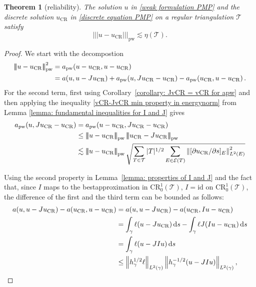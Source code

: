 \documentclass[11pt,a4paper]{article}
\newcommand{\uCR}{u_{\mathrm{CR}}}
\newcommand{\ds}{\,\mathrm{d}s}
\newcommand{\norm}[1]{\left \lVert #1 \right \rVert}
\newcommand{\Ltwo}[2]{\left\lVert #1 \right\rVert_{L^2(#2)}}
\newcommand{\pwenorm}[1]{\left\lvert\!\left\lvert\!\left\lvert #1 \right\rvert\!\right\rvert\!\right\rvert_{\mathrm{pw}}}
\newcommand{\apw}[2]{a_{\mathrm{pw}}\!\left(#1,#2\right)}
\newcommand{\CR}{\mathrm{CR}^1_0(\mathcal{T})}
\newtheorem{theorem}{Theorem}
\begin{document}
\begin{theorem}[reliability]\label{theorem: estimator bounds error}
The solution \(u\) in \eqref{weak formulation PMP} and the discrete solution \(\uCR\) in \eqref{discrete equation PMP} on a regular triangulation \(\mathcal{T}\) satisfy
\[\pwenorm{u - \uCR} \lesssim \eta(\mathcal{T}).\]
\end{theorem}
\begin{proof}
We start with the decompostion 
\begin{align}
\pwenorm{u-\uCR}^2 &= \apw{u-\uCR}{u - \uCR} \notag \\
&= a(u,u-J\uCR) + \apw{u}{J\uCR-\uCR} - \apw{\uCR}{u-\uCR} \label{decomposition of error}.
\end{align}
For the second term, first using Corollary~\ref{corollary: JvCR = vCR for apw} and then applying the inequality \eqref{vCR-JvCR min property in energynorm} from Lemma \ref{lemma: fundamental inequalities for I and J} gives
\begin{align} \label{second term}
\apw{u}{J\uCR -\uCR} &= \apw{u - \uCR}{J\uCR - \uCR} \notag\\
&\le \pwenorm{u-\uCR} \pwenorm{\uCR - J\uCR} \notag \\
&\lesssim \pwenorm{u-\uCR} \sqrt{\sum_{T \in \mathcal{T}}|T|^{1/2} \sum_{E \in \mathcal{E}(T)} \norm{[\partial \uCR/\partial s]_E}^2_{L^2(E)}}
\end{align}

Using the second property in Lemma~\ref{lemma: properties of I and J} and the fact that, since \(I\) maps to the bestapproximation in \(\CR\), \(I=\mathrm{id}\) on \(\CR\), the difference of the first and the third term can be bounded as follows: 
\begin{align}
\label{first and thrid term}
a(u,u-J\uCR) - a(\uCR,u-\uCR) &= a(u,u-J\uCR) - a(\uCR, Iu-\uCR) \notag\\
&= \int_\gamma \ell (u-J\uCR) \ds - \int_\gamma \ell J(Iu-\uCR) \ds \notag \\
&= \int_\gamma \ell (u-JIu) \ds \notag \\
&\le \Ltwo{h_\gamma^{1/2} \ell}{\gamma} \Ltwo{h_\gamma^{-1/2}(u-JIu)}{\gamma},
\end{align}


\end{proof}
\end{document}
